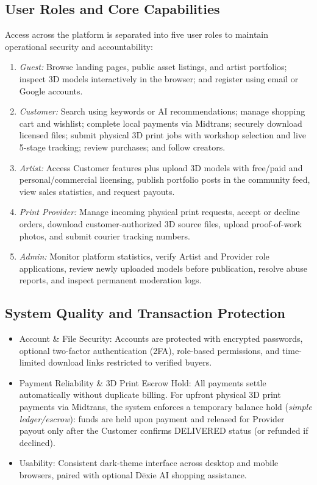\documentclass[11pt,a4paper]{article}
\begin{document}
\subsection{User Roles and Core Capabilities}
Access across the platform is separated into five user roles to maintain operational security and accountability:
\begin{enumerate}[leftmargin=1.5em, itemsep=2pt]
    \item \textit{Guest:} Browse landing pages, public asset listings, and artist portfolios; inspect 3D models interactively in the browser; and register using email or Google accounts.
    \item \textit{Customer:} Search using keywords or AI recommendations; manage shopping cart and wishlist; complete local payments via Midtrans; securely download licensed files; submit physical 3D print jobs with workshop selection and live 5-stage tracking; review purchases; and follow creators.
    \item \textit{Artist:} Access Customer features plus upload 3D models with free/paid and personal/commercial licensing, publish portfolio posts in the community feed, view sales statistics, and request payouts.
    \item \textit{Print Provider:} Manage incoming physical print requests, accept or decline orders, download customer-authorized 3D source files, upload proof-of-work photos, and submit courier tracking numbers.
    \item \textit{Admin:} Monitor platform statistics, verify Artist and Provider role applications, review newly uploaded models before publication, resolve abuse reports, and inspect permanent moderation logs.
\end{enumerate}

\subsection{System Quality and Transaction Protection}
\begin{itemize}[leftmargin=1.5em, itemsep=2pt]
    \item Account \& File Security: Accounts are protected with encrypted passwords, optional two-factor authentication (2FA), role-based permissions, and time-limited download links restricted to verified buyers.
    \item Payment Reliability \& 3D Print Escrow Hold: All payments settle automatically without duplicate billing. For upfront physical 3D print payments via Midtrans, the system enforces a temporary balance hold (\textit{simple ledger/escrow}): funds are held upon payment and released for Provider payout only after the Customer confirms DELIVERED status (or refunded if declined).
    \item Usability: Consistent dark-theme interface across desktop and mobile browsers, paired with optional D\={e}xie AI shopping assistance.
\end{itemize}
\end{document}
